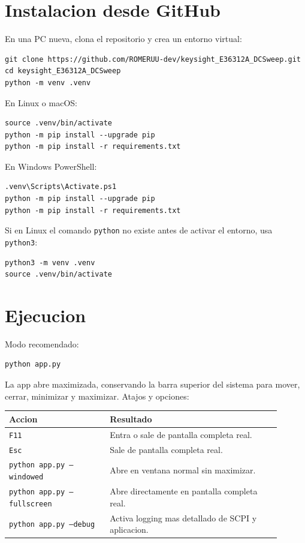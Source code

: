 \documentclass[11pt,letterpaper]{article}
\begin{document}
\section{Instalacion desde GitHub}

En una PC nueva, clona el repositorio y crea un entorno virtual:

\begin{verbatim}
git clone https://github.com/ROMERUU-dev/keysight_E36312A_DCSweep.git
cd keysight_E36312A_DCSweep
python -m venv .venv
\end{verbatim}

En Linux o macOS:

\begin{verbatim}
source .venv/bin/activate
python -m pip install --upgrade pip
python -m pip install -r requirements.txt
\end{verbatim}

En Windows PowerShell:

\begin{verbatim}
.venv\Scripts\Activate.ps1
python -m pip install --upgrade pip
python -m pip install -r requirements.txt
\end{verbatim}

Si en Linux el comando \texttt{python} no existe antes de activar el entorno,
usa \texttt{python3}:

\begin{verbatim}
python3 -m venv .venv
source .venv/bin/activate
\end{verbatim}

\section{Ejecucion}

Modo recomendado:

\begin{verbatim}
python app.py
\end{verbatim}

La app abre maximizada, conservando la barra superior del sistema para mover,
cerrar, minimizar y maximizar. Atajos y opciones:

\begin{longtable}{>{\raggedright\arraybackslash}p{0.33\linewidth}p{0.57\linewidth}}
\textbf{Accion} & \textbf{Resultado} \\
\hline
\texttt{F11} & Entra o sale de pantalla completa real. \\
\texttt{Esc} & Sale de pantalla completa real. \\
\texttt{python app.py --windowed} & Abre en ventana normal sin maximizar. \\
\texttt{python app.py --fullscreen} & Abre directamente en pantalla completa real. \\
\texttt{python app.py --debug} & Activa logging mas detallado de SCPI y aplicacion. \\
\end{longtable}
\end{document}
